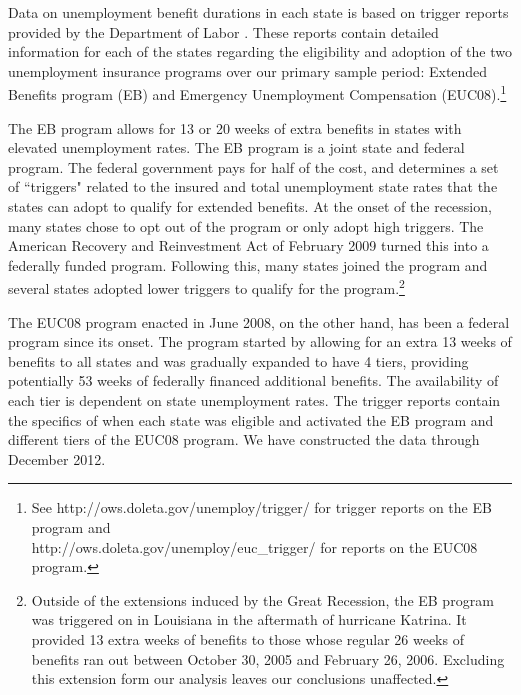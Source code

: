 \documentclass[12pt]{article}
\newcommand{\1}{\mathbf{1}}
\begin{document}
Data on unemployment benefit durations in each state is based on trigger reports provided by the Department of Labor \citep{data:dol-triggers,data:hmm-openicpsr}. These reports contain detailed information for each of the states regarding the eligibility and adoption of the two unemployment insurance programs over our primary sample period: Extended Benefits program (EB) and Emergency Unemployment Compensation (EUC08).\footnote{See http://ows.doleta.gov/unemploy/trigger/ for trigger reports on the EB program and \\ http://ows.doleta.gov/unemploy/euc\_trigger/ for reports on the EUC08 program.}

The EB program allows for 13 or 20 weeks of extra benefits in states with elevated unemployment rates. The EB program is a joint state and federal program.  The federal government pays for half of the cost, and determines a set of ``triggers" related to the insured and total unemployment state rates that the states can adopt to qualify for extended benefits.   At the onset of the recession, many states chose to opt out of the program or only adopt high triggers. The American Recovery and Reinvestment Act of February 2009 turned this into a federally funded program. Following this, many states joined the program and several states adopted lower triggers to qualify for the program.\footnote{Outside of the extensions induced by the Great Recession, the EB program was triggered on in Louisiana in the aftermath of hurricane Katrina. It provided 13 extra weeks of benefits to those whose regular 26 weeks of benefits ran out between October 30, 2005 and February 26, 2006. Excluding this extension form our analysis leaves our conclusions unaffected.}


The EUC08 program enacted in June 2008, on the other hand, has been a federal program since its onset. The program started by allowing for an extra 13 weeks of benefits to all states and was gradually expanded to have 4 tiers, providing potentially 53 weeks of federally financed additional benefits. The availability of each tier is dependent on state unemployment rates. The trigger reports contain the specifics of when each state was eligible and activated the EB program and different tiers of the EUC08 program. We have constructed the data through December 2012.
\end{document}
